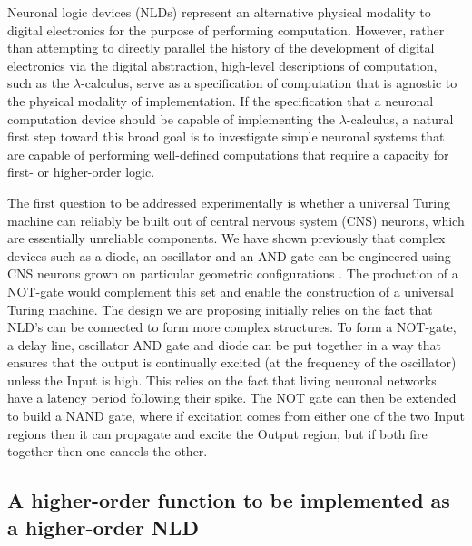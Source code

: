 Neuronal logic devices (NLDs) represent an alternative physical modality
to digital electronics for the purpose of performing computation.
However, rather than attempting to directly parallel the history of the
development of digital electronics via the digital abstraction,
high-level descriptions of computation, such as the
$\lambda$-calculus, serve as a specification
of computation that is agnostic to the physical modality of
implementation. If the specification that a neuronal computation device
should be capable of implementing the
$\lambda$-calculus, a natural first step
toward this broad goal is to investigate simple neuronal systems that
are capable of performing well-defined computations that require a
capacity for first- or higher-order logic.

The first question to be addressed experimentally is whether a universal Turing machine can reliably be built out of central nervous system (CNS) neurons, which are essentially unreliable components. We have shown previously that complex devices such as a diode, an oscillator and an AND-gate can be engineered using CNS neurons grown on particular geometric configurations \cite{Feinerman2008}. The production of a NOT-gate would complement this set and enable the construction of a universal Turing machine.
The design we are proposing initially relies on the fact that NLD's can be connected to form more complex structures. To form a NOT-gate, a delay line, oscillator AND gate and diode can be put together in a way that ensures that the output is continually excited (at the frequency of the oscillator) unless the Input is high. This relies on the fact that living neuronal networks have a latency period following their spike. The NOT gate can then be extended to build a NAND gate, where if excitation comes from either one of the two Input regions then it can propagate and excite the Output region, but if both fire together then one cancels the other.

\subsection{A higher-order function to be implemented as a higher-order NLD}

